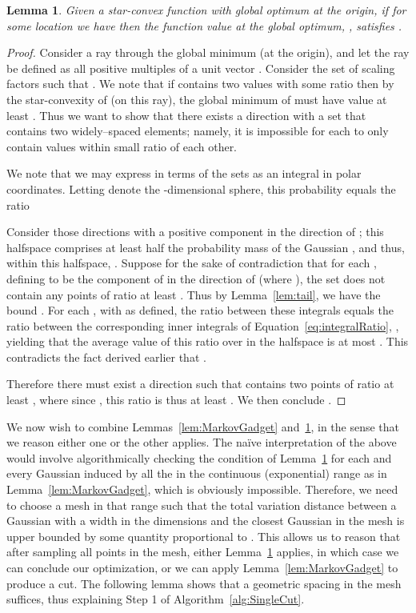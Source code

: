 \documentclass[11pt,letter]{article}
\newcounter{nTheorems}
\numberwithin{nTheorems}{section}
\newtheorem{lemma}[nTheorems]{Lemma}
\begin{document}
\begin{lemma}
\label{lem:Victory}
Given a star-convex function  with global optimum at the origin, if for some location  we have  then
the function value at the global optimum, , satisfies .

\end{lemma}
\begin{proof}
  Consider a ray through the global minimum (at the origin), and let the ray be defined as all positive multiples of a unit vector . Consider the set  of scaling factors  such that . We note that if  contains two values  with some ratio  then by the star-convexity of  (on this ray), the global minimum of  must have value at least . Thus we want to show that there exists a direction  with a set  that contains two widely--spaced elements; namely, it is impossible for each  to only contain values within small ratio of each other.

  We note that we may express  in terms of the sets  as an integral in polar coordinates. Letting  denote the -dimensional sphere, this probability equals the ratio
  
  Consider those directions  with a positive component in the direction of ; this halfspace  comprises at least half the probability mass of the Gaussian , and thus, within this halfspace, . Suppose for the sake of contradiction that for each , defining   to be the component of  in the direction of  (where ), the set  does not contain any points of ratio at least . Thus by Lemma~\ref{lem:tail}, we have the bound . For each , with  as defined, the ratio between these integrals equals the ratio between the corresponding inner integrals of Equation~\ref{eq:integralRatio}, , yielding that the average value of this ratio over  in the halfspace  is at most . This contradicts the fact derived earlier that .

  Therefore there must exist a direction  such that  contains two points of ratio at least , where since , this ratio is thus at least . We then conclude .
\end{proof}

We now wish to combine Lemmas~\ref{lem:MarkovGadget} and~\ref{lem:Victory}, in the sense that we reason either one or the other applies.
The na\"{i}ve interpretation of the above would involve algorithmically checking the condition of Lemma~\ref{lem:Victory} for each and every Gaussian induced by all the  in the continuous (exponential) range as in Lemma~\ref{lem:MarkovGadget}, which is obviously impossible.
Therefore, we need to choose a mesh in that range such that the total variation distance between a Gaussian with a width  in the  dimensions and the closest Gaussian in the mesh is upper bounded by some quantity proportional to .
This allows us to reason that after sampling all points in the mesh, either Lemma~\ref{lem:Victory} applies, in which case we can conclude our optimization, or we can apply Lemma~\ref{lem:MarkovGadget} to produce a cut.
The following lemma shows that a geometric spacing in the mesh suffices, thus explaining Step 1 of Algorithm~\ref{alg:SingleCut}.
\end{document}

